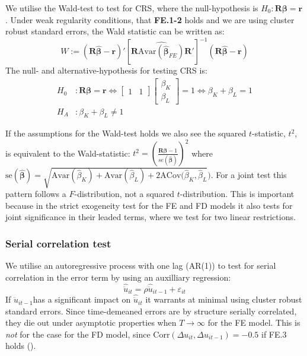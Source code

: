 
We utilise the Wald-test to test for CRS, where the null-hypothesis is $H_0: \mathbf{R}\boldsymbol{\beta}=\mathbf{r}$. Under weak regularity conditions, that \textbf{FE.1-2} holds and we are using cluster robust standard errors, the Wald statistic can be written as:
\begin{equation*}
    W:=(\mathbf{R}{\boldsymbol{\hat\beta}}-\mathbf{r})'
    [\mathbf{R}\widehat{\text{Avar}({\boldsymbol{\hat{\beta}}}_{FE})}\mathbf{R}']^{-1}
    (\mathbf{R} \boldsymbol{\hat{\beta}}-\mathbf{r})
\end{equation*}
The null- and alternative-hypothesis for testing CRS is:
\begin{align*}
  H_0 & : \mathbf{R}\boldsymbol{\beta}=\mathbf{r} \Leftrightarrow
\begin{bmatrix} 1&1 \end{bmatrix} \begin{bmatrix} \beta_K \\ \beta_L \end{bmatrix} =1
\Leftrightarrow \beta_K+\beta_L=1  \\
H_A & : \beta_K+\beta_L \neq 1
\end{align*}

If the assumptions for the Wald-test holds we also see the squared $t$-statistic, $t^2$, is equivalent to the Wald-statistic: $t^2=(\frac{\textbf{R}\bm{\hat\beta}-1}{se(\bm{\hat\beta})})^2$ where  $\text{se}(\bm{\hat\beta})=\sqrt{\text{Avar}(\hat\beta_K)+\text{Avar}(\hat\beta_L)+2\text{ACov}({\hat\beta_K,\hat\beta_L}})$. For a joint test this pattern follows a $F$-distribution, not a squared $t$-distribution. This is important because in the strict exogeneity test for the FE and FD models it also tests for joint significance in their leaded terms, where we test for two linear restrictions.

\subsubsection*{Serial correlation test}
We utilise an autoregressive process with one lag (AR(1)) to test for serial correlation in the error term by using an auxilliary regression:
\begin{equation*}
    \hat{\ddot{u}}_{it}=\rho \hat{\ddot{u}}_{it-1}+\varepsilon_{it}
\end{equation*}
If $\hat{\ddot{u}}_{it-1}$has a significant impact on $\hat{\ddot{u}}_{it}$ it warrants at minimal using cluster robust standard errors. Since time-demeaned errors are by structure serially correlated, they die out under asymptotic properties when $T\rightarrow \infty$ for the FE model. This is \textit{not} for the case for the FD model, since $\text{Corr}(\Delta u_{it},\Delta u_{it-1})=-0.5$ if FE.3 holds (\cite[Chapter~10.6.3]{wooldridgeEconometricAnalysisCross2010}).

